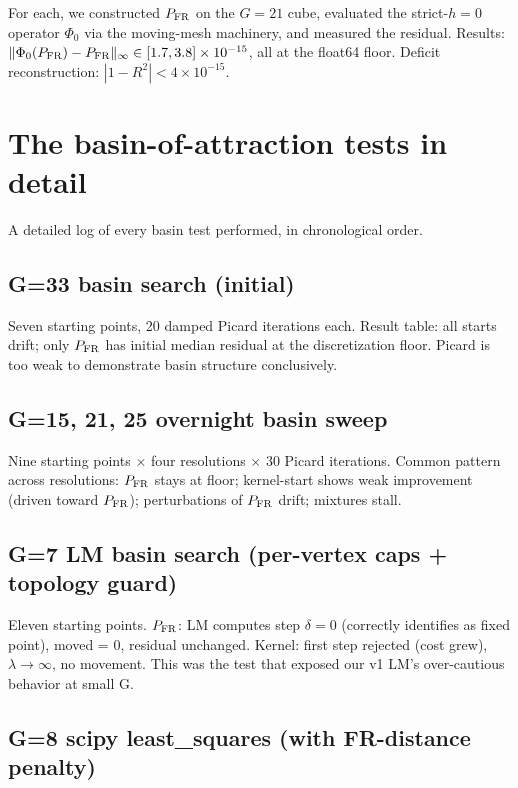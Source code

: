 \documentclass[11pt]{article}
\newcommand{\1}{\mathbf{1}}
\newcommand{\PFR}{P_{\rm FR}}
\begin{document}
For each, we constructed $\PFR$ on the $G=21$ cube, evaluated the
strict-$h=0$ operator $\Phi_0$ via the moving-mesh machinery, and
measured the residual.  Results: $\|\Phi_0(\PFR) - \PFR\|_\infty \in
[1.7, 3.8] \times 10^{-15}$, all at the float64 floor.  Deficit
reconstruction: $|1 - R^2| < 4 \times 10^{-15}$.

\section{The basin-of-attraction tests in detail}
\label{app:basin}

A detailed log of every basin test performed, in chronological order.

\subsection{G=33 basin search (initial)}

Seven starting points, 20 damped Picard iterations each.  Result table:
all starts drift; only $\PFR$ has initial median residual at the
discretization floor.  Picard is too weak to demonstrate basin
structure conclusively.

\subsection{G=15, 21, 25 overnight basin sweep}

Nine starting points $\times$ four resolutions $\times$ 30 Picard
iterations.  Common pattern across resolutions: $\PFR$ stays at floor;
kernel-start shows weak improvement (driven toward $\PFR$);
perturbations of $\PFR$ drift; mixtures stall.

\subsection{G=7 LM basin search (per-vertex caps + topology guard)}

Eleven starting points.  $\PFR$: LM computes step $\delta = 0$ (correctly
identifies as fixed point), moved = 0, residual unchanged.  Kernel:
first step rejected (cost grew), $\lambda \to \infty$, no movement.
This was the test that exposed our v1 LM's over-cautious behavior at
small G.

\subsection{G=8 scipy least\_squares (with FR-distance penalty)}
\end{document}
